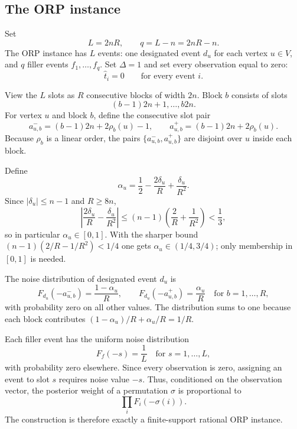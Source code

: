 \documentclass[11pt]{article}
\begin{document}
\subsection{The ORP instance}

Set
\begin{equation}
  L=2nR,
  \qquad q=L-n=2nR-n.
\end{equation}
The ORP instance has $L$ events: one designated event $d_u$ for each vertex $u\in V$, and $q$ filler events $f_1,
\ldots,f_q$.  Set $\Delta=1$ and set every observation equal to zero:
\begin{equation}
  \hat t_i=0\qquad\text{for every event }i.
\end{equation}

View the $L$ slots as $R$ consecutive blocks of width $2n$.  Block $b$ consists of slots
\begin{equation}
  (b-1)2n+1,\ldots,b2n.
\end{equation}
For vertex $u$ and block $b$, define the consecutive slot pair
\begin{equation}
  a_{u,b}^-=(b-1)2n+2\rho_b(u)-1,
  \qquad
  a_{u,b}^+=(b-1)2n+2\rho_b(u).
\end{equation}
Because $\rho_b$ is a linear order, the pairs $\{a_{u,b}^-,a_{u,b}^+\}$ are disjoint over $u$ inside each block.

Define
\begin{equation}
  \alpha_u=\frac12-\frac{2\delta_u}{R}+\frac{\delta_u}{R^2}.
\end{equation}
Since $|\delta_u|\le n-1$ and $R\ge 8n$,
\begin{equation}
  \left|\frac{2\delta_u}{R}-\frac{\delta_u}{R^2}\right|
  \le (n-1)\left(\frac2R+\frac1{R^2}\right)<\frac13,
\end{equation}
so in particular $\alpha_u\in[0,1]$.  With the sharper bound $(n-1)(2/R-1/R^2)<1/4$ one gets $\alpha_u\in(1/4,3/4)$; only membership in $[0,1]$ is needed.

The noise distribution of designated event $d_u$ is
\begin{equation}
  F_{d_u}(-a_{u,b}^-)=\frac{1-\alpha_u}{R},
  \qquad
  F_{d_u}(-a_{u,b}^+)=\frac{\alpha_u}{R}
  \quad\text{for }b=1,\ldots,R,
\end{equation}
with probability zero on all other values.  The distribution sums to one because each block contributes $(1-\alpha_u)/R+\alpha_u/R=1/R$.

Each filler event has the uniform noise distribution
\begin{equation}
  F_f(-s)=\frac1L\quad\text{for }s=1,
\ldots,L,
\end{equation}
with probability zero elsewhere.  Since every observation is zero, assigning an event to slot $s$ requires noise value $-s$.  Thus, conditioned on the observation vector, the posterior weight of a permutation $\sigma$ is proportional to
\begin{equation}
  \prod_i F_i(-\sigma(i)).
\end{equation}
The construction is therefore exactly a finite-support rational ORP instance.
\end{document}
